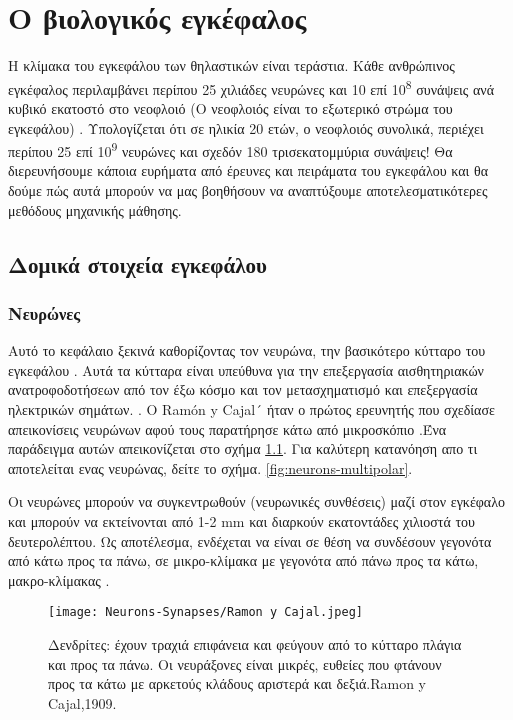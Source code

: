 \documentclass[12pt]{report}
\begin{document}
\chapter{Ο βιολογικός εγκέφαλος}
Η κλίμακα του εγκεφάλου των θηλαστικών είναι τεράστια. Κάθε ανθρώπινος εγκέφαλος περιλαμβάνει περίπου 25 χιλιάδες νευρώνες και 10 επί 10\textsuperscript{8} συνάψεις ανά κυβικό εκατοστό \cite{nguyen2013} στο νεοφλοιό (Ο νεοφλοιός είναι το εξωτερικό στρώμα του εγκεφάλου) . Υπολογίζεται ότι σε ηλικία 20 ετών, ο νεοφλοιός συνολικά, περιέχει περίπου 25 επί 10\textsuperscript{9} νευρώνες και σχεδόν 180 τρισεκατομμύρια συνάψεις! Θα διερευνήσουμε κάποια ευρήματα από έρευνες και πειράματα του εγκεφάλου και θα δούμε πώς αυτά μπορούν να μας βοηθήσουν να αναπτύξουμε αποτελεσματικότερες  μεθόδους μηχανικής μάθησης.

\section{Δομικά στοιχεία εγκεφάλου}
\subsection{Νευρώνες}
Αυτό το κεφάλαιο ξεκινά καθορίζοντας τον νευρώνα, την βασικότερο κύτταρο του εγκεφάλου \cite{gerstner2014}. Αυτά τα κύτταρα είναι υπεύθυνα για την επεξεργασία αισθητηριακών ανατροφοδοτήσεων από τον έξω κόσμο και τον μετασχηματισμό και επεξεργασία ηλεκτρικών σημάτων. \cite{balduzzi2013}. Ο \textlatin{Ramón y Cajal´} ήταν ο πρώτος ερευνητής που σχεδίασε απεικονίσεις νευρώνων αφού τους παρατήρησε κάτω από μικροσκόπιο \cite{garcialopezp2010}
.Ένα παράδειγμα αυτών απεικονίζεται στο σχήμα \ref{fig:neurons-ramoncajal}. Για καλύτερη κατανόηση απο τι αποτελείται ενας νευρώνας, δείτε το σχήμα. \ref{fig:neurons-multipolar}.

Οι νευρώνες μπορούν να συγκεντρωθούν (νευρωνικές συνθέσεις) μαζί στον εγκέφαλο και μπορούν να εκτείνονται από 1-2 mm και διαρκούν εκατοντάδες χιλιοστά του δευτερολέπτου. Ως αποτέλεσμα, ενδέχεται να είναι σε θέση να συνδέσουν γεγονότα από κάτω προς τα πάνω, σε μικρο-κλίμακα με γεγονότα από πάνω προς τα κάτω, μακρο-κλίμακας \cite{Badin2017}.
\begin{figure}[htp]
    \centering
    \texttt{[image: Neurons-Synapses/Ramon y Cajal.jpeg]}
    \caption{Δενδρίτες: έχουν τραχιά επιφάνεια και φεύγουν από το κύτταρο πλάγια και προς τα πάνω. Οι νευράξονες είναι μικρές, ευθείες που φτάνουν προς τα κάτω με αρκετούς κλάδους αριστερά και δεξιά.\textlatin{Ramon y Cajal},1909.}
    \label{fig:neurons-ramoncajal}
\end{figure}
\end{document}
